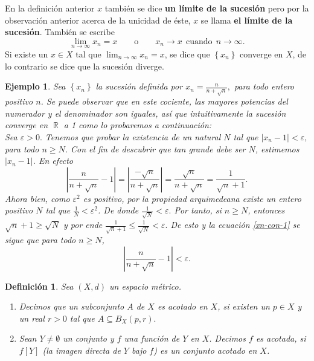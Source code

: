 \documentclass[x11names, 12pt]{book}
\newtheorem{definicion}{Definición}
\newtheorem{example}{Ejemplo}
\DeclareMathOperator{\R}{\mathbb{R}}
\begin{document}
En la definición anterior $x$ también se dice \textbf{un límite de la sucesión} pero por la observación anterior acerca de la unicidad de éste, $x$ se llama \textbf{el límite de la sucesión}. También se escribe $$\lim_{n\to \infty}x_n=x \qquad \text{o} \qquad x_n\to x \ \ \text{cuando} \ \ n\to \infty .$$   Si existe un $x\in X$ tal que $\lim_{n\to \infty}x_n=x$, se dice que $\left\{x_n \right\}$ converge en $X$, de lo contrario se dice que la sucesión diverge.

 \begin{example}
 Sea $\left\{x_n \right\}$ la sucesión definida por $x_n=\frac{n}{n+\sqrt{n}},$ para todo entero positivo $n$. Se puede observar que en este cociente, las mayores potencias del numerador y el denominador son iguales, así que intuitivamente la sucesión converge en $\R$ a 1 como lo probaremos a continuación:\\
 Sea $\varepsilon>0.$ Tenemos que probar la existencia de un natural $N$ tal que $|x_n-1|<\varepsilon,$ para todo $n\geq N$. Con el fin de descubrir que tan grande debe ser $N$, estimemos $|x_n-1|$. En efecto
 \begin{equation}\label{xn-con-1}
     \left| \frac{n}{n+\sqrt{n}}-1 \right| = \left| \frac{-\sqrt{n}}{n+\sqrt{n}}\right|=\frac{\sqrt{n}}{n+\sqrt{n}}=\frac{1}{\sqrt{n}+1} .
 \end{equation}
Ahora bien, como $ \varepsilon ^2$ es positivo, por la propiedad arquimedeana existe un entero positivo $N$ tal que $\frac{1}N < \varepsilon^2$. De donde $\frac{1}{\sqrt{N}}<\varepsilon.$ Por tanto, si $n\geq N$, entonces $\sqrt{n}+1 \geq \sqrt{N}$ y por ende $\frac{1}{\sqrt{n}+1}\leq \frac{1}{\sqrt{N}}<\varepsilon.$ De esto y la ecuación  \eqref{xn-con-1} se sigue que para todo $n\geq N$, $$\left| \frac{n}{n+\sqrt{n}}-1 \right| <\varepsilon.$$
 \end{example}



\begin{definicion}
    Sea $(X,d)$ un espacio métrico.
    \begin{enumerate}
        \item Decimos que un subconjunto $A$ de $X$ es acotado en $X$, si existen un $p\in X$ y un real $r>0$ tal que $A\subseteq B_X(p, r).$
        \item Sean  $Y\neq \emptyset$ un conjunto y $f$ una función de $Y$ en $X$. Decimos $f$ es acotada, si $f[Y]$ (la imagen directa de $Y$ bajo $f$) es un conjunto acotado en $X$.
    \end{enumerate}
\end{definicion}
\end{document}

